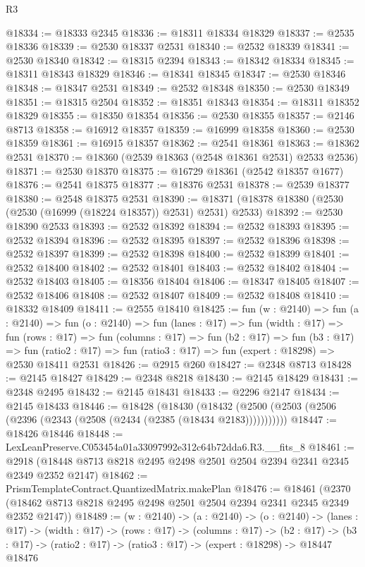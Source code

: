 \begin{lexlean}{R3}
\begin{coremodule}
@18334 := @18333 @2345
@18336 := @18311 @18334 @18329
@18337 := @2535 @18336
@18339 := @2530 @18337 @2531
@18340 := @2532 @18339
@18341 := @2530 @18340
@18342 := @18315 @2394
@18343 := @18342 @18334
@18345 := @18311 @18343 @18329
@18346 := @18341 @18345
@18347 := @2530 @18346
@18348 := @18347 @2531
@18349 := @2532 @18348
@18350 := @2530 @18349
@18351 := @18315 @2504
@18352 := @18351 @18343
@18354 := @18311 @18352 @18329
@18355 := @18350 @18354
@18356 := @2530 @18355
@18357 := @2146 @8713
@18358 := @16912 @18357
@18359 := @16999 @18358
@18360 := @2530 @18359
@18361 := @16915 @18357
@18362 := @2541 @18361
@18363 := @18362 @2531
@18370 := @18360 (@2539 @18363 (@2548 @18361 @2531) @2533 @2536)
@18371 := @2530 @18370
@18375 := @16729 @18361 (@2542 @18357 @1677)
@18376 := @2541 @18375
@18377 := @18376 @2531
@18378 := @2539 @18377
@18380 := @2548 @18375 @2531
@18390 := @18371 (@18378 @18380 (@2530 (@2530 (@16999 (@18224 @18357)) @2531) @2531) @2533)
@18392 := @2530 @18390 @2533
@18393 := @2532 @18392
@18394 := @2532 @18393
@18395 := @2532 @18394
@18396 := @2532 @18395
@18397 := @2532 @18396
@18398 := @2532 @18397
@18399 := @2532 @18398
@18400 := @2532 @18399
@18401 := @2532 @18400
@18402 := @2532 @18401
@18403 := @2532 @18402
@18404 := @2532 @18403
@18405 := @18356 @18404
@18406 := @18347 @18405
@18407 := @2532 @18406
@18408 := @2532 @18407
@18409 := @2532 @18408
@18410 := @18332 @18409
@18411 := @2555 @18410
@18425 := fun (w : @2140) =>
  fun (a : @2140) =>
  fun (o : @2140) =>
  fun (lanes : @17) =>
  fun (width : @17) =>
  fun (rows : @17) =>
  fun (columns : @17) =>
  fun (b2 : @17) =>
  fun (b3 : @17) =>
  fun (ratio2 : @17) => fun (ratio3 : @17) => fun (expert : @18298) => @2530 @18411 @2531
@18426 := @2915 @260
@18427 := @2348 @8713
@18428 := @2145 @18427
@18429 := @2348 @8218
@18430 := @2145 @18429
@18431 := @2348 @2495
@18432 := @2145 @18431
@18433 := @2296 @2147
@18434 := @2145 @18433
@18446 := @18428
    (@18430 (@18432 (@2500 (@2503 (@2506 (@2396 (@2343 (@2508 (@2434 (@2385 (@18434 @2183)))))))))))
@18447 := @18426 @18446
@18448 := LexLeanPreserve.C053454a01a33097992e312c64b72dda6.R3.__fits_8
@18461 := @2918 (@18448 @8713 @8218 @2495 @2498 @2501 @2504 @2394 @2341 @2345 @2349 @2352 @2147)
@18462 := PrismTemplateContract.QuantizedMatrix.makePlan
@18476 := @18461
    (@2370 (@18462 @8713 @8218 @2495 @2498 @2501 @2504 @2394 @2341 @2345 @2349 @2352 @2147))
@18489 := (w : @2140) ->
  (a : @2140) ->
  (o : @2140) ->
  (lanes : @17) ->
  (width : @17) ->
  (rows : @17) ->
  (columns : @17) ->
  (b2 : @17) -> (b3 : @17) -> (ratio2 : @17) -> (ratio3 : @17) -> (expert : @18298) -> @18447 @18476

\end{coremodule}
\end{lexlean}

